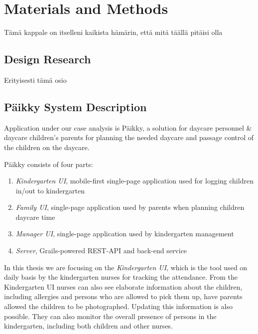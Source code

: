 
\chapter{Materials and Methods}
Tämä kappale on itselleni kaikista hämärin, että mitä täällä pitäisi olla


\section{Design Research}
Erityisesti tämä osio



\section{Päikky System Description}
Application under our case analysis is Päikky, a solution for daycare personnel & daycare children’s parents for planning the needed daycare and passage control of the children on the daycare. 

Päikky consists of four parts:

\begin{enumerate}
	\item \textit{Kindergarten UI}, mobile-first single-page application used for logging children in/out to kindergarten
	\item \textit{Family UI}, single-page application used by parents when planning children daycare time
	\item \textit{Manager UI}, single-page application used by kindergarten management 
	\item \textit{Server}, Grails-powered REST-API and back-end service
\end{enumerate}

\noindent In this thesis we are focusing on the \textit{Kindergarten UI}, which is the tool used on daily basis by the kindergarten nurses for tracking the attendance. From the Kindergarten UI nurses can also see elaborate information about the children, including allergies and persons who are allowed to pick them up, have parents allowed the children to be photographed. Updating this information is also possible. They can also monitor the overall presence of persons in the kindergarten, including both children and other nurses.

